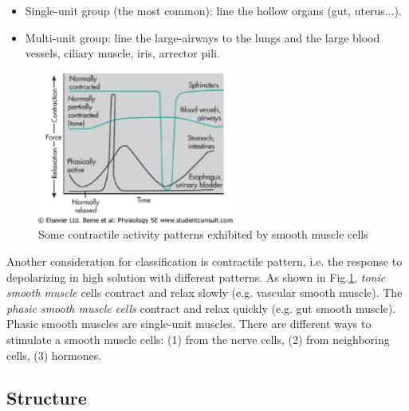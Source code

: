 \begin{itemize}
\item Single-unit group (the most common): line the hollow organs
  (gut, uterus...).
\item Multi-unit group: line the large-airways to the lungs and the
  large blood vessels, ciliary muscle, iris, arrector pili.
\end{itemize}


\begin{figure}[htb]
  \centerline{\includegraphics[height=5cm]{./images/smooth_muscle_cells_rhythmic_contraction.eps}}
  \caption{Some contractile activity patterns exhibited by smooth
    muscle cells}\label{fig:rhythmic_contraction_SMC}
\end{figure}

Another consideration for classification is contractile pattern,
i.e. the response to depolarizing in high  solution with
different patterns. As shown in
Fig.\ref{fig:rhythmic_contraction_SMC}, {\it tonic smooth muscle}
cells contract and relax slowly (e.g. vascular smooth muscle). The
{\it phasic smooth muscle cells} contract and relax quickly (e.g. gut
smooth muscle). Phasic smooth muscles are single-unit muscles.  There
are different ways to stimulate a smooth muscle cells: (1) from the
nerve cells, (2) from neighboring cells, (3) hormones.



\subsection{Structure}
\label{sec:structure-2}


